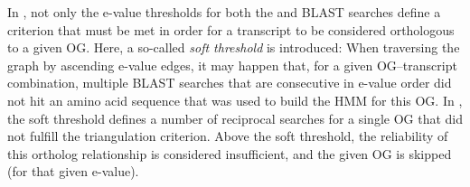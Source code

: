 In \pname, not only the e-value thresholds for both the  and
BLAST searches define a criterion that must be met in order for a transcript to
be considered orthologous to a given OG. Here, a so-called \emph{soft threshold}
is introduced: When traversing the graph by ascending  e-value
edges, it may happen that, for a given OG--transcript combination, multiple
BLAST searches that are consecutive in e-value order did not hit an amino acid
sequence that was used to build the HMM for this OG. In \pname, the soft
threshold defines a number of reciprocal searches for a single OG that did not
fulfill the triangulation criterion. Above the soft threshold, the reliability
of this ortholog relationship is considered insufficient, and the given OG is
skipped (for that given  e-value). 

